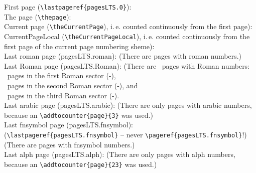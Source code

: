 \documentclass[british]{article}
\def\pagesLTSexampleArabic{3}
\def\pagesLTSexamplealph{23}
\begin{document}
\noindent First page (\texttt{\textbackslash lastpageref\{pagesLTS.0\}}):
\\

\noindent The page (\texttt{\textbackslash thepage}): \thepage \\

\noindent Current page (\texttt{\textbackslash theCurrentPage}),
i.\,e. counted continuously from the first page): \theCurrentPage \\

\noindent CurrentPageLocal (\texttt{\textbackslash theCurrentPageLocal}),
i.\,e. counted continuously from the first page of the
current page numbering sheme): \theCurrentPageLocal \\

\noindent Last roman page (pagesLTS.roman): 
(There are  pages with roman numbers.)\\

\noindent Last Roman page (pagesLTS.Roman): 
(There are ~pages with Roman numbers:\\
~pages in the first Roman sector
(\pageref{Roman}{\hskip3em }-),\\
~pages in the second Roman sector
(\pageref{Roman2}{\hskip3em }-), and\\
~pages in the third Roman sector
(\pageref{Roman3}{\hskip3em }-).\\

\noindent Last arabic page (pagesLTS.arabic): 
(There are only  pages with arabic numbers,
because an \texttt{\textbackslash addtocounter\{page\}\{\pagesLTSexampleArabic\}} was used.)\\

\noindent Last fnsymbol page (pagesLTS.fnsymbol):  \\
(\texttt{\textbackslash lastpageref\{pagesLTS.fnsymbol\}} -- never
\texttt{\textbackslash pageref\{pagesLTS.fnsymbol\}}!)\\
(There are  pages with fnsymbol numbers.)\\

\noindent Last alph page (pagesLTS.alph): 
(There are only  pages with alph numbers,
because an \texttt{\textbackslash addtocounter\{page\}\{\pagesLTSexamplealph\}} was used.)\\
\end{document}
